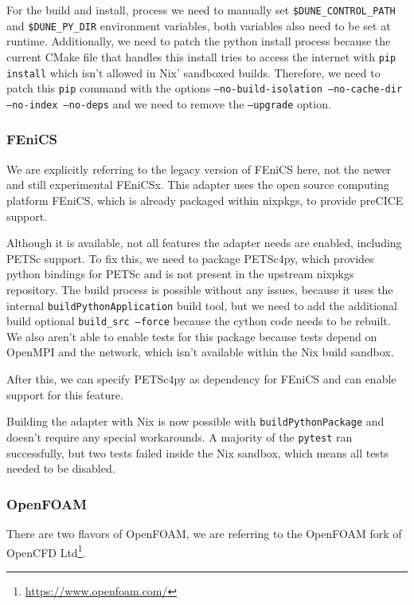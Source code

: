 \documentclass[conference,final,a4paper]{IEEEtran}
\begin{document}
For the build and install, process we need to manually set \texttt{\$DUNE\_CONTROL\_PATH} and \texttt{\$DUNE\_PY\_DIR} environment variables, both variables also need to be set at runtime.
Additionally, we need to patch the python install process because the current CMake file that handles this install tries to access the internet with \texttt{pip install} which isn't allowed in Nix' sandboxed builds.
Therefore, we need to patch this \texttt{pip} command with the options \texttt{--no-build-isolation --no-cache-dir --no-index --no-deps} and we need to remove the \texttt{--upgrade} option.\\

\subsubsection{FEniCS}

We are explicitly referring to the legacy version of FEniCS here, not the newer and still experimental FEniCSx.
This adapter uses the open source computing platform FEniCS, which is already packaged within nixpkgs, to provide preCICE support.

Although it is available, not all features the adapter needs are enabled, including PETSc support.
To fix this, we need to package PETSc4py, which provides python bindings for PETSc and is not present in the upstream nixpkgs repository.
The build process is possible without any issues, because it uses the internal \texttt{buildPythonApplication} build tool, but we need to add the additional build optional \texttt{build\_src --force} because the cython code needs to be rebuilt.
We also aren't able to enable tests for this package because tests depend on OpenMPI and the network, which isn't available within the Nix build sandbox.

After this, we can specify PETSc4py as dependency for FEniCS and can enable support for this feature.

Building the adapter with Nix is now possible with \texttt{buildPythonPackage} and doesn't require any special workarounds.
A majority of the \texttt{pytest} ran successfully, but two tests failed inside the Nix sandbox, which means all tests needed to be disabled.\\

\subsubsection{OpenFOAM}

There are two flavors of OpenFOAM, we are referring to the OpenFOAM fork of OpenCFD Ltd\footnote{\url{https://www.openfoam.com/}}.
\end{document}
